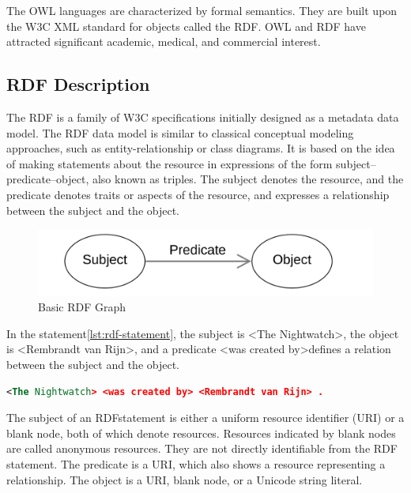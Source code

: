 \documentclass[thesis=M,english,hidelinks]{FITthesis}[2019/12/23]
\begin{document}
The OWL languages are characterized by formal semantics. They are built upon the \gls{W3C} XML standard for objects called the \gls{RDF}. OWL and RDF have attracted significant academic, medical, and commercial interest.

\subsection{RDF Description}\label{rdf-description}

The \gls{RDF} is a family of \gls{W3C} specifications initially designed as a metadata data model. The \gls{RDF} data model is similar to classical conceptual modeling approaches, such as entity-relationship or class diagrams. It is based on the idea of making statements about the resource in expressions of the form subject–predicate–object, also known as triples. The subject denotes the resource, and the predicate denotes traits or aspects of the resource, and expresses a relationship between the subject and the object.

\begin{figure}
	\centering
	\includegraphics[width=0.7\linewidth]{basic_rdf_graph}
	\caption{Basic RDF Graph}
	\label{fig:basicrdfgraph}
\end{figure}


In the statement\ref{lst:rdf-statement}, the subject is \textless The Nightwatch\textgreater, the object is \textless Rembrandt van Rijn\textgreater , and a predicate \textless was created by\textgreater  defines a relation between the subject and the object.

\begin{lstlisting}[language=XML, caption=Example of an RDF statement, label = {lst:rdf-statement}]
<The Nightwatch> <was created by> <Rembrandt van Rijn> .
\end{lstlisting}

The subject of an \gls{RDF}statement is either a uniform resource identifier (\gls{URI}) or a blank node, both of which denote resources. Resources indicated by blank nodes are called anonymous resources. They are not directly identifiable from the RDF statement. The predicate is a \gls{URI}, which also shows a resource representing a relationship. The object is a \gls{URI}, blank node, or a Unicode string literal. 
\end{document}

